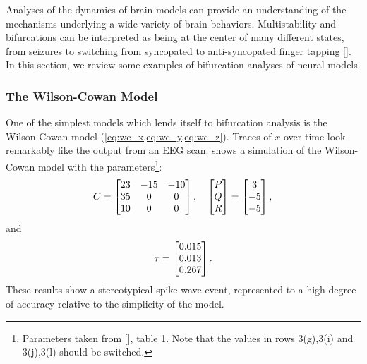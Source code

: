 Analyses of the dynamics of brain models can provide an understanding of the mechanisms underlying a wide variety of brain behaviors.
Multistability and bifurcations can be interpreted as being at the center of many different states, from seizures to switching from syncopated to anti-syncopated finger tapping [].
In this section, we review some examples of bifurcation analyses of neural models.
\subsubsection{The Wilson-Cowan Model}
\label{sec:lit_review_bifurcation_wc}
One of the simplest models which lends itself to bifurcation analysis is the Wilson-Cowan model (\cref{eq:wc_x,eq:wc_y,eq:wc_z}).
Traces of $x$ over time look remarkably like the output from an EEG scan.
 shows a simulation of the Wilson-Cowan model with the parameters\footnote{Parameters taken from [], table 1.  Note that the values in rows 3(g),3(i) and 3(j),3(l) should be switched.}:
\begin{equation*}
  \label{eq:wc_params}
  C
  =
  \bmqty{23 & -15 & -10 \\ 35 & 0 & 0 \\ 10 & 0 & 0}
  \qc
  \bmqty{P \\ Q \\ R}
  =
  \bmqty{3 \\ -5 \\ -5}, \\
\end{equation*}
and
\begin{equation}
  \tau
  =
  \bmqty{0.015 \\ 0.013 \\ 0.267}.
\end{equation}
These results show a stereotypical spike-wave event, represented to a high degree of accuracy relative to the simplicity of the model.
